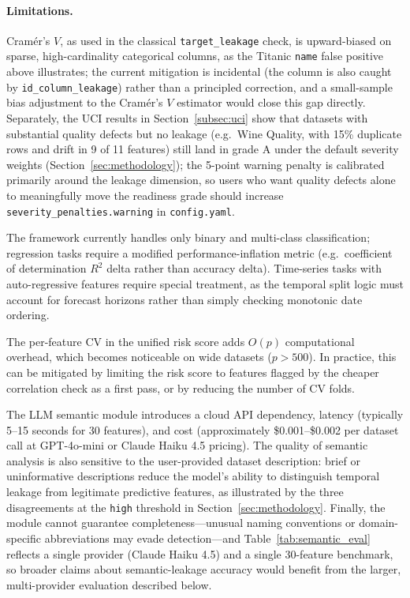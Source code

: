 \documentclass[11pt]{article}
\begin{document}
\paragraph{Limitations.}
Cram\'er's $V$, as used in the classical \texttt{target\_leakage} check, is
upward-biased on sparse, high-cardinality categorical columns, as the
Titanic \texttt{name} false positive above illustrates; the current
mitigation is incidental (the column is also caught by
\texttt{id\_column\_leakage}) rather than a principled correction, and a
small-sample bias adjustment to the Cram\'er's $V$ estimator would close
this gap directly.  Separately, the UCI results in
Section~\ref{subsec:uci} show that datasets with substantial quality
defects but no leakage (e.g.\ Wine Quality, with 15\% duplicate rows and
drift in 9 of 11 features) still land in grade A under the default
severity weights (Section~\ref{sec:methodology}); the 5-point warning
penalty is calibrated primarily around the leakage dimension, so users who
want quality defects alone to meaningfully move the readiness grade should
increase \texttt{severity\_penalties.warning} in \texttt{config.yaml}.

The framework currently handles only binary and multi-class classification;
regression tasks require a modified performance-inflation metric (e.g.\
coefficient of determination $R^2$ delta rather than accuracy delta).
Time-series tasks with auto-regressive features require special treatment,
as the temporal split logic must account for forecast horizons rather than
simply checking monotonic date ordering.

The per-feature CV in the unified risk score adds $O(p)$ computational
overhead, which becomes noticeable on wide datasets ($p > 500$).  In
practice, this can be mitigated by limiting the risk score to features
flagged by the cheaper correlation check as a first pass, or by reducing
the number of CV folds.

The LLM semantic module introduces a cloud API dependency, latency
(typically 5--15 seconds for 30 features), and cost (approximately
\$0.001--\$0.002
per dataset call at GPT-4o-mini or Claude Haiku 4.5 pricing).  The quality of semantic analysis
is also sensitive to the user-provided dataset description: brief or
uninformative descriptions reduce the model's ability to distinguish
temporal leakage from legitimate predictive features, as illustrated by the
three disagreements at the \texttt{high} threshold in
Section~\ref{sec:methodology}.  Finally, the module
cannot guarantee completeness---unusual naming conventions or domain-specific
abbreviations may evade detection---and
Table~\ref{tab:semantic_eval} reflects a single provider (Claude Haiku 4.5)
and a single 30-feature benchmark, so broader claims about semantic-leakage
accuracy would benefit from the larger, multi-provider evaluation described
below.
\end{document}
